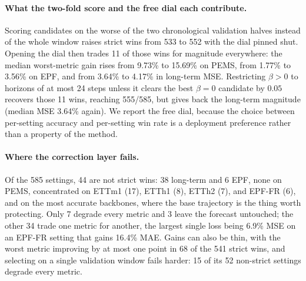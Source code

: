 \paragraph{What the two-fold score and the free dial each contribute.}
Scoring candidates on the worse of the two chronological validation halves instead of
the whole window raises strict wins from 533 to 552 with the dial pinned shut.
Opening the dial then trades 11 of those wins for magnitude everywhere: the median
worst-metric gain rises from 9.73\% to 15.69\% on PEMS, from 1.77\% to 3.56\% on EPF,
and from 3.64\% to 4.17\% in long-term MSE. Restricting $\beta>0$ to horizons of at
most 24 steps unless it clears the best $\beta=0$ candidate by $0.05$ recovers those
11 wins, reaching 555/585, but gives back the long-term magnitude (median MSE 3.64\%
again). We report the free dial, because the choice between per-setting accuracy and
per-setting win rate is a deployment preference rather than a property of the
method.

\paragraph{Where the correction layer fails.}
Of the 585 settings, 44 are not strict wins: 38 long-term and 6 EPF, none on PEMS,
concentrated on ETTm1 (17), ETTh1 (8), ETTh2 (7), and EPF-FR (6), and on the most
accurate backbones, where the base trajectory is the thing worth protecting. Only 7
degrade every metric and 3 leave the forecast untouched; the other 34 trade one
metric for another, the largest single loss being 6.9\% MSE on an EPF-FR setting that
gains 16.4\% MAE. Gains can also be thin, with the worst metric improving by at most
one point in 68 of the 541 strict wins, and selecting on a single validation window
fails harder: 15 of its 52 non-strict settings degrade every metric.
